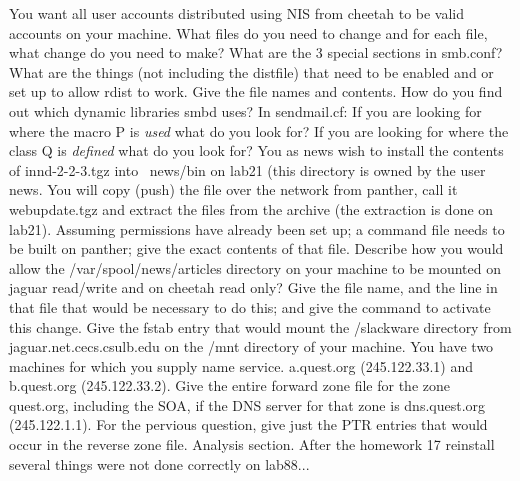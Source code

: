 \vskip 2.0in
\ques
You want all user accounts distributed using NIS from cheetah
to be valid accounts on your machine.
What files do you need to change and for each file, what change do
you need to make?
\vskip 1.0in
\ques
What are the 3 special sections in {\ltt{}smb.conf}?
\vskip 1.0in
\vfill\eject
\ques
What are the things (not including the distfile) that need to be
enabled and or set up to allow {\ltt{}rdist} to work.
Give the file names and contents.
\vskip 2.0in
\ques
How do you find out which dynamic libraries {\ltt{}smbd} uses?
\vskip 0.5in
\ques
In {\ltt{}sendmail.cf}:
If you are looking for where the macro P is {\it used} what do you look for?
If you are looking for where the class Q is {\it defined} what do you look for?
\vskip 1.0in
\ques
You as {\ltt{}news} wish to install the contents
of {\ltt{}innd-2-2-3.tgz}
into {\ltt{}~news/bin} on {\ltt{}lab21}
(this directory is owned by the user {\ltt{}news}.
You will copy (push) the file over the network from {\ltt{}panther},
call it {\ltt{}webupdate.tgz} and extract the files from
the archive (the extraction is done on {\ltt{}lab21}).
Assuming permissions have already been set up;
a command file needs to be built on {\ltt{}panther};
give the exact contents of that file.
\vskip 2.5in
\vfill\eject
\ques
Describe how you would allow
the {\ltt{}/var/spool/news/articles} directory on your machine to be mounted
on {\ltt{}jaguar} read/write
and on {\ltt{}cheetah} read only?
Give the file name, and the line in that file that would be
necessary to do this; and give the command to activate this change.
\vskip 1.7in
\ques
Give the {\ltt{}fstab} entry that would mount
the {\ltt{}/slackware} directory from {\ltt{}jaguar.net.cecs.csulb.edu}
on the {\ltt{}/mnt} directory of your machine.
\vskip 0.8in
\ques
You have two machines for which you supply name service.
{\ltt{}a.quest.org} (245.122.33.1) and 
{\ltt{}b.quest.org} (245.122.33.2).
Give the entire forward zone file for the zone {\ltt{}quest.org},
including the SOA, if the DNS server for that zone
is {\ltt{}dns.quest.org} ({\ltt{}245.122.1.1}).
\vskip 3.5in
\ques
For the pervious question, give just the {\ltt{}PTR} entries
that would occur in the reverse zone file.
\vfill\eject
Analysis section. After the homework 17 reinstall
several things were not done correctly on {\ltt{}lab88}...

